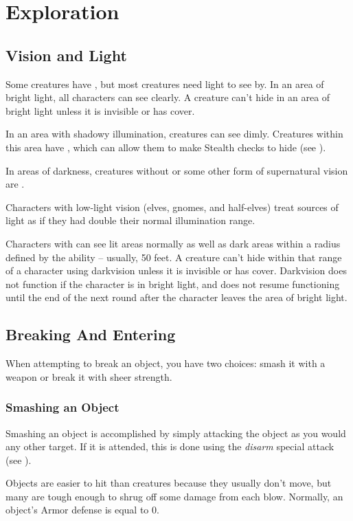 \section{Exploration}
    \subsection{Vision and Light}
        Some creatures have , but most creatures need light to see by. 
        In an area of bright light, all characters can see clearly. A creature can't hide in an area of bright light unless it is invisible or has cover.

        In an area with shadowy illumination, creatures can see dimly.
        Creatures within this area have \concealment, which can allow them to make Stealth checks to hide (see ).

        In areas of darkness, creatures without  or some other form of supernatural vision are \blinded.

        Characters with low-light vision (elves, gnomes, and half-elves) treat sources of light as if they had double their normal illumination range.

        Characters with  can see lit areas normally as well as dark areas within a radius defined by the ability -- usually, 50 feet. A creature can't hide within that range of a character using darkvision unless it is invisible or has cover. Darkvision does not function if the character is in bright light, and does not resume functioning until the end of the next round after the character leaves the area of bright light.

    \subsection{Breaking And Entering}
        When attempting to break an object, you have two choices: smash it with a weapon or break it with sheer strength.

        \subsubsection{Smashing an Object}
            Smashing an object is accomplished by simply attacking the object as you would any other target. If it is attended, this is done using the \textit{disarm} special attack (see ).

             Objects are easier to hit than creatures because they usually don't move, but many are tough enough to shrug off some damage from each blow.
            Normally, an object's Armor defense is equal to 0.

